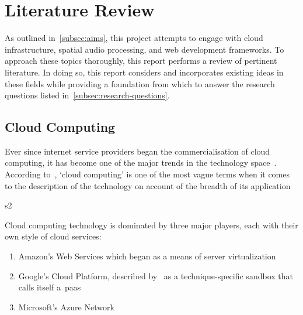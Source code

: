 
\thispagestyle{plain}
\newpage
\section{Literature Review}\label{sec:literature-review}

\normalsize

As outlined in~\ref{subsec:aims}, this project attempts to engage with cloud infrastructure, spatial audio processing, and web development frameworks.
To approach these topics thoroughly, this report performs a review of pertinent literature.
In doing so, this report considers and incorporates existing ideas in these fields while providing a foundation from which to answer the research questions listed in~\ref{subsec:research-questions}.

\subsection{Cloud Computing}\label{subsec:cloud-computing}

Ever since internet service providers began the commercialisation of cloud computing, it has become one of the major trends in the technology space~\citep{cc_overview}.
According to~\citet{cc_overview}, `cloud computing' is one of the most vague terms when it comes to the description of the technology on account of the breadth of its application


s2\citep{cc_challenges}

Cloud computing technology is dominated by three major players, each with their own style of cloud services:
\begin{enumerate}
    \item Amazon's Web Services which began as a means of server virtualization~\citep{awsintro}
    \item Google's Cloud Platform, described by~\citet{cc_overview} as a technique-specific sandbox that calls itself a~\gls{paas}~\citep{googlecloudintro}
    \item Microsoft's Azure Network~\citep{azurefundamentals}
\end{enumerate}




